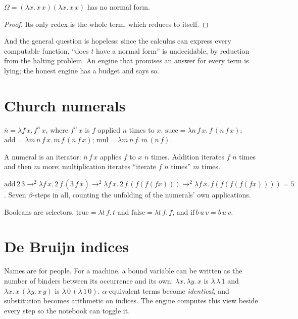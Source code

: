 \begin{theorem}
  $\Omega = (\lambda x.\, x\, x)(\lambda x.\, x\, x)$ has no normal form.
\end{theorem}
\begin{proof}
  Its only redex is the whole term, which reduces to itself.
\end{proof}

And the general question is hopeless: since the calculus can express every computable function,
``does $t$ have a normal form'' is undecidable, by reduction from the halting problem. An engine
that promises an answer for every term is lying; the honest engine has a budget and says so.

\section{Church numerals}

\begin{definition}
  $\overline{n} = \lambda f\, x.\, f^n\, x$, where $f^n\, x$ is $f$ applied $n$ times to $x$.
  $\mathrm{succ} = \lambda n\, f\, x.\, f\,(n\, f\, x)$; $\mathrm{add} = \lambda m\, n\, f\, x.\,
  m\, f\, (n\, f\, x)$; $\mathrm{mul} = \lambda m\, n\, f.\, m\, (n\, f)$.
\end{definition}

A numeral is an iterator: $\overline{n}\, f\, x$ applies $f$ to $x$ $n$ times. Addition iterates
$f$ $n$ times and then $m$ more; multiplication iterates ``iterate $f$ $n$ times'' $m$ times.

\begin{exbox}
  $\mathrm{add}\, \overline 2\, \overline 3 \to^2 \lambda f\, x.\, \overline 2\, f\, (\overline 3\, f\, x)
  \to^2 \lambda f\, x.\, \overline 2\, f\, (f (f (f x))) \to^2 \lambda f\, x.\, f (f (f (f (f x)))) =
  \overline 5$. Seven $\beta$-steps in all, counting the unfolding of the numerals' own
  applications.
\end{exbox}

Booleans are selectors, $\mathrm{true} = \lambda t\, f.\, t$ and $\mathrm{false} = \lambda t\, f.\,
f$, and $\mathrm{if}\, b\, u\, v = b\, u\, v$.

\section{De Bruijn indices}

Names are for people. For a machine, a bound variable can be written as the number of binders
between its occurrence and its own: $\lambda x.\, \lambda y.\, x$ is $\lambda\, \lambda\, 1$ and
$\lambda x.\, x\, (\lambda y.\, x\, y)$ is $\lambda\, 0\, (\lambda\, 1\, 0)$. $\alpha$-equivalent
terms become \emph{identical}, and substitution becomes arithmetic on indices. The engine
computes this view beside every step so the notebook can toggle it.

